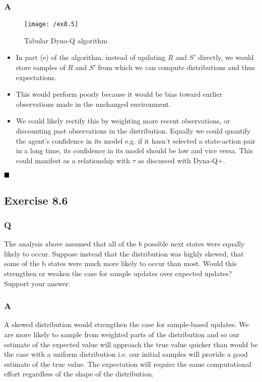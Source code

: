 \subsubsection{A}
\begin{figure}[h!]
	\centering
	\texttt{[image: /ex8.5]}
	\caption{Tabular Dyna-Q algorithm}
	\label{fig: dyna-Q}
\end{figure}
\begin{itemize}
\item In part (e) of the algorithm, instead of updating $R$ and $S'$ directly, we would store samples of $R$ and $S'$ from which we can compute distributions and thus expectations. 
\item This would perform poorly because it would be bias toward earlier observations made in the unchanged environment.
\item We could likely rectify this by weighting more recent observations, or discounting past observations in the distribution. Equally we could quantify the agent's confidence in its model e.g. if it hasn't selected a state-action pair in a long time, its confidence in its model should be low and vice versa. This could manifest as a relationship with $\tau$ as discussed with Dyna-Q+.
\end{itemize}

$
\hfill \blacksquare
$

\subsection{Exercise 8.6}
\subsubsection{Q}
The analysis above assumed that all of the $b$ possible next states were equally likely to occur. Suppose instead that the distribution was highly skewed, that some of the b states were much more likely to occur than most. Would this strengthen or weaken the case for sample updates over expected updates? Support your answer. 
\subsubsection{A}
A skewed distribution would strengthen the case for sample-based updates. We are more likely to sample from weighted parts of the distribution and so our estimate of the expected value will approach the true value quicker than would be the case with a uniform distribution i.e. our initial samples will provide a good estimate of the true value. The expectation will require the same computational effort regardless of the shape of the distribution.

